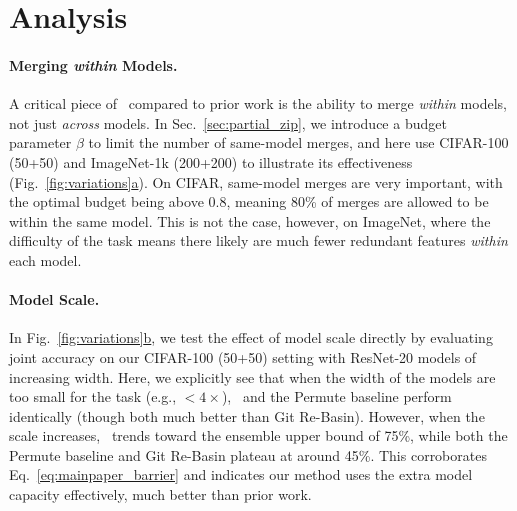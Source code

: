 
\section{Analysis} \label{sec:ablations}


\paragraph{Merging \textit{within} Models.}
A critical piece of \name{}\ compared to prior work is the ability to merge \textit{within} models, not just \textit{across} models. In Sec.~\ref{sec:partial_zip}, we introduce a budget parameter $\beta$ to limit the number of same-model merges, 
and here use CIFAR-100 (50+50) and ImageNet-1k (200+200) to illustrate its effectiveness (Fig.~\ref{fig:variations}\hyperref[fig:variations]{a}).
On CIFAR, same-model merges are very important, with the optimal budget being above 0.8, meaning 80\% of merges are allowed to be within the same model. This is not the case, however, on ImageNet, where the difficulty of the task means there likely are much fewer redundant features \textit{within} each model.

\paragraph{Model Scale.}
In Fig.~\ref{fig:variations}\hyperref[fig:variations]{b}, we test the effect of model scale directly by evaluating joint accuracy on our CIFAR-100 (50+50) setting with ResNet-20 models of increasing width. Here, we explicitly see that when the width of the models are too small for the task (e.g., $<4\times$), \name{}\ and the Permute baseline perform identically (though both much better than Git Re-Basin). However, when the scale increases, \name{}\ trends toward the ensemble upper bound of 75\%, while both the Permute baseline and Git Re-Basin plateau at around 45\%. This corroborates Eq.~\ref{eq:mainpaper_barrier} and indicates our method uses the extra model capacity effectively, much better than prior work.

\vspace{-1em}
